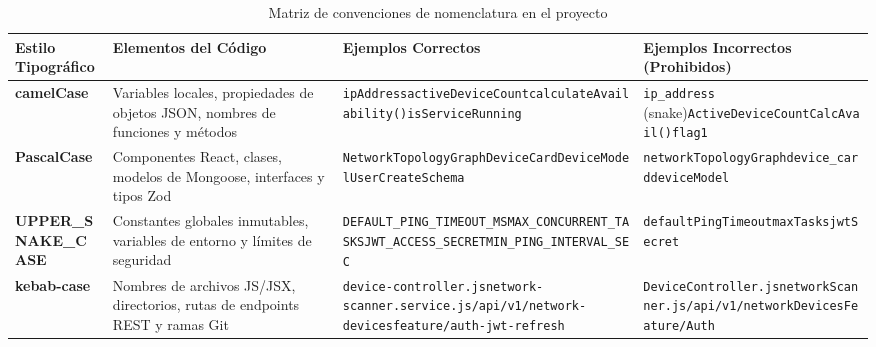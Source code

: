 \documentclass[12pt,a4paper]{report}
\begin{document}
\begin{table}[htbp]
\centering
\caption{Matriz de convenciones de nomenclatura en el proyecto}\label{tab:nomenclatura}
\small
\begin{tabularx}{\textwidth}{p{3.2cm} p{3.2cm} p{4.2cm} X}
\toprule
\textbf{Estilo Tipográfico} & \textbf{Elementos del Código} & \textbf{Ejemplos Correctos} & \textbf{Ejemplos Incorrectos (Prohibidos)} \\
\midrule
\textbf{camelCase} & Variables locales, propiedades de objetos JSON, nombres de funciones y métodos & \texttt{ipAddress}\newline \texttt{activeDeviceCount}\newline \texttt{calculateAvailability()}\newline \texttt{isServiceRunning} & \texttt{ip\_address} (snake)\newline \texttt{ActiveDeviceCount}\newline \texttt{CalcAvail()}\newline \texttt{flag1} \\
\midrule
\textbf{PascalCase} & Componentes React, clases, modelos de Mongoose, interfaces y tipos Zod & \texttt{NetworkTopologyGraph}\newline \texttt{DeviceCard}\newline \texttt{DeviceModel}\newline \texttt{UserCreateSchema} & \texttt{networkTopologyGraph}\newline \texttt{device\_card}\newline \texttt{deviceModel} \\
\midrule
\textbf{UPPER\_SNAKE\_CASE} & Constantes globales inmutables, variables de entorno y límites de seguridad & \texttt{DEFAULT\_PING\_TIMEOUT\_MS}\newline \texttt{MAX\_CONCURRENT\_TASKS}\newline \texttt{JWT\_ACCESS\_SECRET}\newline \texttt{MIN\_PING\_INTERVAL\_SEC} & \texttt{defaultPingTimeout}\newline \texttt{maxTasks}\newline \texttt{jwtSecret} \\
\midrule
\textbf{kebab-case} & Nombres de archivos JS/JSX, directorios, rutas de endpoints REST y ramas Git & \texttt{device-controller.js}\newline \texttt{network-scanner.service.js}\newline \texttt{/api/v1/network-devices}\newline \texttt{feature/auth-jwt-refresh} & \texttt{DeviceController.js}\newline \texttt{networkScanner.js}\newline \texttt{/api/v1/networkDevices}\newline \texttt{Feature/Auth} \\
\bottomrule
\end{tabularx}
\end{table}
\end{document}
